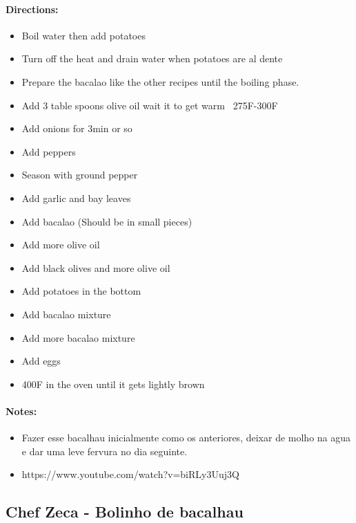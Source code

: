 \documentclass{article}
\begin{document}
\paragraph{Directions:}
\begin{itemize}
    \item Boil water then add potatoes
    \item Turn off the heat and drain water when potatoes are al dente
    \item Prepare the bacalao like the other recipes until the boiling phase.
    \item Add 3 table spoons olive oil wait it to get warm ~275F-300F
    \item Add onions for 3min or so
    \item Add peppers
    \item Season with ground pepper
    \item Add garlic and bay leaves
    \item Add bacalao (Should be in small pieces)
    \item Add more olive oil
    \item Add black olives and more olive oil
    \item Add potatoes in the bottom
    \item Add bacalao mixture
    \item Add more bacalao mixture
    \item Add eggs
    \item 400F in the oven until it gets lightly brown
\end{itemize}

\paragraph{Notes:}
\begin{itemize}
    \item Fazer esse bacalhau inicialmente como os anteriores, deixar de molho na agua e dar uma leve fervura no dia seguinte.
    \item https://www.youtube.com/watch?v=biRLy3Uuj3Q
\end{itemize}

\subsection{Chef Zeca - Bolinho de bacalhau} 
\end{document}

